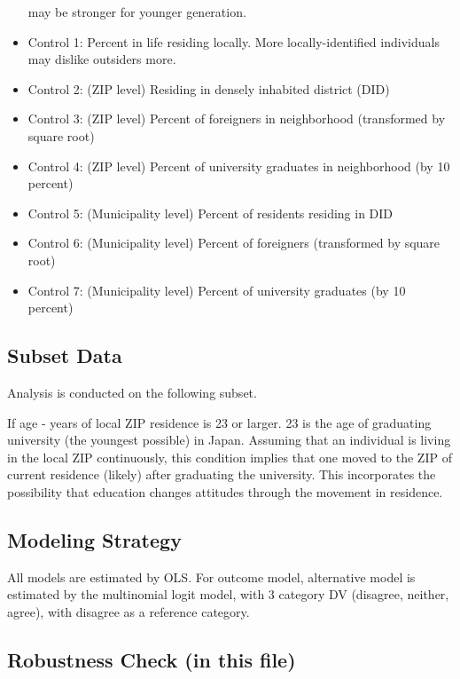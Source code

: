 \documentclass[
]{article}
\begin{document}
\begin{itemize}
  may be stronger for younger generation.
\item
  Control 1: Percent in life residing locally. More locally-identified
  individuals may dislike outsiders more.
\item
  Control 2: (ZIP level) Residing in densely inhabited district (DID)
\item
  Control 3: (ZIP level) Percent of foreigners in neighborhood
  (transformed by square root)\\
\item
  Control 4: (ZIP level) Percent of university graduates in neighborhood
  (by 10 percent)
\item
  Control 5: (Municipality level) Percent of residents residing in DID
\item
  Control 6: (Municipality level) Percent of foreigners (transformed by
  square root)
\item
  Control 7: (Municipality level) Percent of university graduates (by 10
  percent)
\end{itemize}

\hypertarget{subset-data}{%
\subsection{Subset Data}\label{subset-data}}

Analysis is conducted on the following subset.

If age - years of local ZIP residence is 23 or larger. 23 is the age of
graduating university (the youngest possible) in Japan. Assuming that an
individual is living in the local ZIP continuously, this condition
implies that one moved to the ZIP of current residence (likely) after
graduating the university. This incorporates the possibility that
education changes attitudes through the movement in residence.

\hypertarget{modeling-strategy}{%
\subsection{Modeling Strategy}\label{modeling-strategy}}

All models are estimated by OLS. For outcome model, alternative model is
estimated by the multinomial logit model, with 3 category DV (disagree,
neither, agree), with disagree as a reference category.

\hypertarget{robustness-check-in-this-file}{%
\subsection{Robustness Check (in this
file)}\label{robustness-check-in-this-file}}
\end{document}
